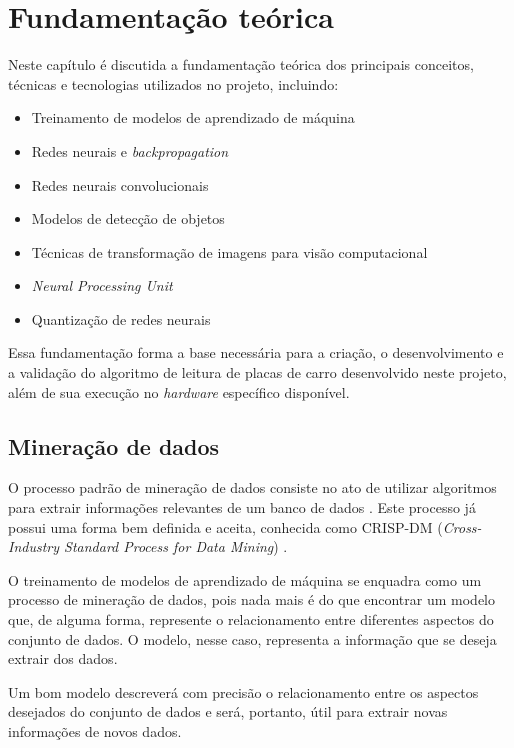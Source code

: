 \chapter{Fundamentação teórica}

Neste capítulo é discutida a fundamentação teórica dos principais conceitos, técnicas e tecnologias utilizados no projeto, incluindo:

\begin{itemize}
    \item Treinamento de modelos de aprendizado de máquina
    \item Redes neurais e \textit{backpropagation}
    \item Redes neurais convolucionais
    \item Modelos de detecção de objetos
    \item Técnicas de transformação de imagens para visão computacional
    \item \textit{Neural Processing Unit}
    \item Quantização de redes neurais
\end{itemize}

Essa fundamentação forma a base necessária para a criação, o desenvolvimento e a validação do algoritmo de leitura de placas de carro desenvolvido neste projeto, além de sua execução no \textit{hardware} específico disponível.

\section{Mineração de dados}

O processo padrão de mineração de dados consiste no ato de utilizar algoritmos para extrair informações relevantes de um banco de dados \cite{data-mining}. Este processo já possui uma forma bem definida e aceita, conhecida como CRISP-DM (\textit{Cross-Industry Standard Process for Data Mining}) \cite{crisp-dm}.

O treinamento de modelos de aprendizado de máquina se enquadra como um processo de mineração de dados, pois nada mais é do que encontrar um modelo que, de alguma forma, represente o relacionamento entre diferentes aspectos do conjunto de dados. O modelo, nesse caso, representa a informação que se deseja extrair dos dados.

Um bom modelo descreverá com precisão o relacionamento entre os aspectos desejados do conjunto de dados e será, portanto, útil para extrair novas informações de novos dados.

